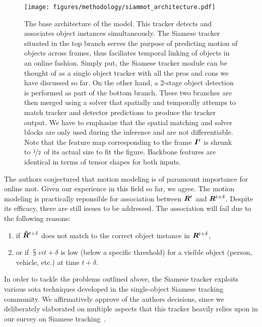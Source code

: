 \begin{figure}[t]
    \centering
    \texttt{[image: figures/methodology/siammot\_architecture.pdf]}
    \caption[\siammot{} architecture]{The base architecture of the \siammot{} model. This tracker detects and associates object instances simultaneously. The Siamese tracker situated in the top branch serves the purpose of predicting motion of objects across frames, thus faciliates temporal linking of objects in an online fashion. Simply put, the Siamese tracker module can be thought of as a single object tracker with all the pros and cons we have discussed so far. On the other hand, a $2$-stage object detection is performed as part of the bottom branch. These two branches are then merged using a solver that spatially and temporally attemps to match tracker and detector predictions to produce the tracker output. We have to emphasize that the spatial matching and solver blocks are only used during the inference and are not differentiable. Note that the feature map corresponding to the frame $\bm{I}^{t}$ is shrunk to $\nicefrac{1}{2}$ of its actual size to fit the figure. Backbone features are identical in terms of tensor shapes for both inputs. }
    \label{fig:SiamMOTArchitecture}
\end{figure}

The authors conjectured that motion modeling is of paramount importance for online \gls{mot}. Given our experience in this field so far, we agree. The motion modeling is practically reponsible for association between $\bm{R}^{t}$ and $\bm{R}^{t + \delta}$. Despite its efficacy, there are still issues to be addressed. The association will fail due to the following reasons:
\begin{enumerate}
    \item if $\bm{\tilde{R}}^{t + \delta}$ does not match to the correct object instance in $\bm{R}^{t + \delta}$,
    \item or if $\subsup{v}{i}{t + \delta}$ is low (below a specific threshold) for a visible object (person, vehicle, etc.) at time $t + \delta$.
\end{enumerate}
In order to tackle the problems outlined above, the Siamese tracker exploits various \gls{sota} techniques developed in the single-object Siamese tracking community. We affirmatively approve of the authors decisions, since we deliberately elaborated on multiple aspects that this tracker heavily relies upon in our survey on Siamese tracking~\cite{ondrasovic2021siamese}.

